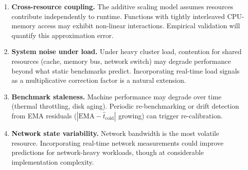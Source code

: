 \documentclass[11pt, a4paper]{article}
\newcommand{\bluecontentend}{\endgroup}
\begin{document}
\begin{enumerate}
    \item \textbf{Cross-resource coupling.} The additive scaling model
          assumes resources contribute independently to runtime.
          Functions with tightly interleaved CPU-memory access may
          exhibit non-linear interactions. Empirical validation will
          quantify this approximation error.

    \item \textbf{System noise under load.} Under heavy cluster load,
          contention for shared resources (cache, memory bus, network
          switch) may degrade performance beyond what static benchmarks
          predict. Incorporating real-time load signals as a
          multiplicative correction factor is a natural extension.

    \item \textbf{Benchmark staleness.} Machine performance may degrade
          over time (thermal throttling, disk aging). Periodic
          re-benchmarking or drift detection from EMA residuals
          ($|\mathrm{EMA} - \hat{t}_{\mathrm{cold}}|$ growing) can
          trigger re-calibration.

    \item \textbf{Network state variability.} Network bandwidth is the
          most volatile resource. Incorporating real-time network
          measurements could improve predictions for network-heavy
          workloads, though at considerable implementation complexity.
\end{enumerate}
\bluecontentend
\end{document}
